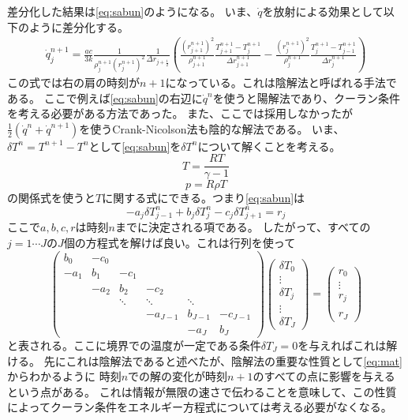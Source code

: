 \documentclass[a4j, dvipdfmx]{jsarticle}
\newcommand{\half}{\frac{1}{2}}
\newcommand{\pnn}{{n + 1}}
\newcommand{\pjj}{{j + 1}}
\newcommand{\mjj}{{j - 1}}
\newcommand{\hpj}{{j + \half}}
\newcommand{\beq}{\begin{equation}}
\newcommand{\eeq}{\end{equation}}
\begin{document}
差分化した結果は\eqref{eq:sabun}のようになる。
いま、$\dot{q}$を放射による効果として以下のように差分化する。
\begin{align}
    \dot{q}^\pnn_j = \frac{ac}{3k}\frac{1}{\rho^\pnn_j (r^\pnn_j)^2}\frac{1}{\Delta r_\hpj}
    \left(\frac{(r^\pnn_\pjj)^2}{\rho^\pnn_\pjj}\frac{T^\pnn_\pjj - T^\pnn_j}{\Delta r^\pnn_\pjj} -
    \frac{(r^\pnn_j)^2}{\rho^\pnn_j}\frac{T^\pnn_j - T^\pnn_\mjj}{\Delta r^\pnn_j}\right)
\end{align}
この式では右の肩の時刻が$\pnn$になっている。これは陰解法と呼ばれる手法である。
ここで例えば\eqref{eq:sabun}の右辺に$\dot{q}^n$を使うと陽解法であり、クーラン条件を考える必要がある方法であった。
また、ここでは採用しなかったが$\half(\dot{q}^n + \dot{q}^\pnn)$を使うCrank-Nicolson法も陰的な解法である。
いま、$\delta T^n = T^\pnn - T^n$として\eqref{eq:sabun}を$\delta T^n$について解くことを考える。
\beq
T = \frac{RT}{\gamma -1}
\eeq
\beq
p = R\rho T
\eeq
の関係式を使うと$T$に関する式にできる。つまり\eqref{eq:sabun}は
\beq
- a_j \delta T^n_\mjj+ b_j \delta T^n_j- c_j \delta T^n_\pjj =r_j
\eeq
ここで$a, b, c, r$は時刻$n$までに決定される項である。
したがって、すべての$j ={1\cdots J}$の$J$個の方程式を解けば良い。これは行列を使って
\beq
\begin{pmatrix}
    b_{0} & -c_{0} &  && \\
    -a_{1} & b_{1} & -c_{1} &&\\
    &-a_{2} & b_{2} & -c_{2} &&\\
&  &  \ddots      &  \ddots      & \ddots \\
&&&-a_{J-1}  & b_{J-1} &-c_{J-1}\\
&&&&-a_{J}  & b_{J} 
\end{pmatrix}
\begin{pmatrix}
\delta T_{0} \\
\vdots  \\
\delta T_{j}  \\
\vdots \\
\delta T_{J}
\end{pmatrix}
=
\begin{pmatrix}
r_{0} \\
\vdots  \\
r_{j}  \\
\\
r_{J}
\end{pmatrix}
\label{eq:mat}
\eeq
と表される。ここに境界での温度が一定である条件$\delta T_J = 0$を与えればこれは解ける。
先にこれは陰解法であると述べたが、陰解法の重要な性質として\eqref{eq:mat}からわかるように
時刻$n$での解の変化が時刻$n+1$のすべての点に影響を与えるという点がある。
これは情報が無限の速さで伝わることを意味して、この性質によってクーラン条件をエネルギー方程式については考える必要がなくなる。
\end{document}
